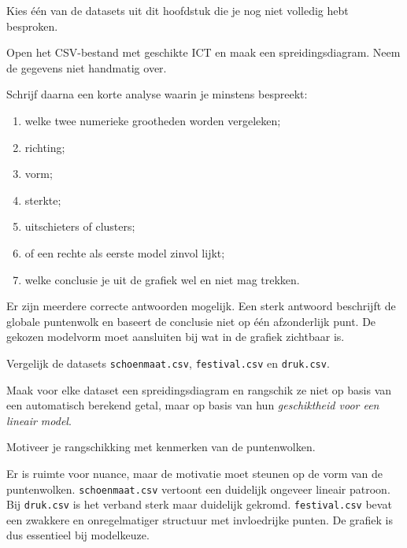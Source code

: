 \documentclass{ximera}
\begin{document}
\begin{oefening}{\oefU \ESS}

Kies één van de datasets uit dit hoofdstuk die je nog niet volledig
hebt besproken.

Open het CSV-bestand met geschikte ICT en maak een spreidingsdiagram.
Neem de gegevens niet handmatig over.

Schrijf daarna een korte analyse waarin je minstens bespreekt:

\begin{enumerate}
  \item welke twee numerieke grootheden worden vergeleken;
  \item richting;
  \item vorm;
  \item sterkte;
  \item uitschieters of clusters;
  \item of een rechte als eerste model zinvol lijkt;
  \item welke conclusie je uit de grafiek wel en niet mag trekken.
\end{enumerate}

\begin{oplossing}
Er zijn meerdere correcte antwoorden mogelijk. Een sterk antwoord
beschrijft de globale puntenwolk en baseert de conclusie niet op één
afzonderlijk punt. De gekozen modelvorm moet aansluiten bij wat in de
grafiek zichtbaar is.
\end{oplossing}

\end{oefening}



\begin{oefening}{\oefG}

Vergelijk de datasets \texttt{schoenmaat.csv}, \texttt{festival.csv}
en \texttt{druk.csv}.

Maak voor elke dataset een spreidingsdiagram en rangschik ze niet op
basis van een automatisch berekend getal, maar op basis van hun
\emph{geschiktheid voor een lineair model}.

Motiveer je rangschikking met kenmerken van de puntenwolken.

\begin{oplossing}
Er is ruimte voor nuance, maar de motivatie moet steunen op de vorm
van de puntenwolken. \texttt{schoenmaat.csv} vertoont een duidelijk
ongeveer lineair patroon. Bij \texttt{druk.csv} is het verband sterk
maar duidelijk gekromd. \texttt{festival.csv} bevat een zwakkere en
onregelmatiger structuur met invloedrijke punten. De grafiek is dus
essentieel bij modelkeuze.
\end{oplossing}

\end{oefening}
\end{document}
